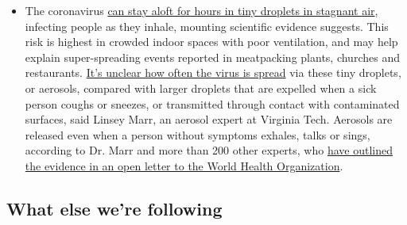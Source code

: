 \begin{itemize}
  \begin{itemize}
  \tightlist
  \item
    The coronavirus
    \href{https://www.nytimes3xbfgragh.onion/2020/07/04/health/239-experts-with-one-big-claim-the-coronavirus-is-airborne.html?action=click\&pgtype=Article\&state=default\&region=MAIN_CONTENT_3\&context=storylines_faq}{can
    stay aloft for hours in tiny droplets in stagnant air}, infecting
    people as they inhale, mounting scientific evidence suggests. This
    risk is highest in crowded indoor spaces with poor ventilation, and
    may help explain super-spreading events reported in meatpacking
    plants, churches and restaurants.
    \href{https://www.nytimes3xbfgragh.onion/2020/07/06/health/coronavirus-airborne-aerosols.html?action=click\&pgtype=Article\&state=default\&region=MAIN_CONTENT_3\&context=storylines_faq}{It's
    unclear how often the virus is spread} via these tiny droplets, or
    aerosols, compared with larger droplets that are expelled when a
    sick person coughs or sneezes, or transmitted through contact with
    contaminated surfaces, said Linsey Marr, an aerosol expert at
    Virginia Tech. Aerosols are released even when a person without
    symptoms exhales, talks or sings, according to Dr. Marr and more
    than 200 other experts, who
    \href{https://academic.oup.com/cid/article/doi/10.1093/cid/ciaa939/5867798}{have
    outlined the evidence in an open letter to the World Health
    Organization}.
  \end{itemize}
\end{itemize}

\hypertarget{what-else-were-following}{%
\subsection{What else we're following}\label{what-else-were-following}}

